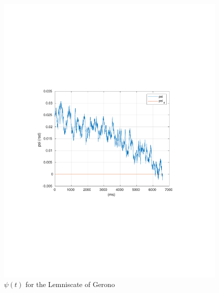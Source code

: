 \begin{frame}
	\begin{figure}[!htb]
		\centering
		\includegraphics[scale=.7,trim={3.5cm 8cm 4cm 8cm},clip]{figuras/CROB_Fuzzy_Gerono/psi.pdf}
		\caption{$\psi(t)$ for the Lemniscate of Gerono}
		\label{fig:crob_lem_psi}
	\end{figure}
\end{frame}
